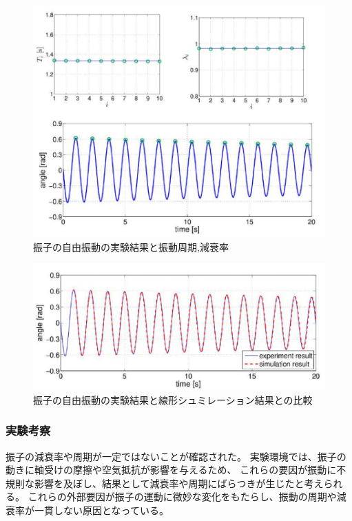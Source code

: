 \newpage

\begin{figure}[H]
  \centering
  \includegraphics[scale=0.7]{sozai/8.pdf}
  \caption{振子の自由振動の実験結果と振動周期,減衰率}
\end{figure}

\begin{figure}[H]
  \centering
  \includegraphics[scale=0.7]{sozai/9.pdf}
  \caption{振子の自由振動の実験結果と線形シュミレーション結果との比較}
\end{figure}


\subsubsection{実験考察}

振子の減衰率や周期が一定ではないことが確認された。
実験環境では、振子の動きに軸受けの摩擦や空気抵抗が影響を与えるため、
これらの要因が振動に不規則な影響を及ぼし、結果として減衰率や周期にばらつきが生じたと考えられる。
これらの外部要因が振子の運動に微妙な変化をもたらし、振動の周期や減衰率が一貫しない原因となっている。

